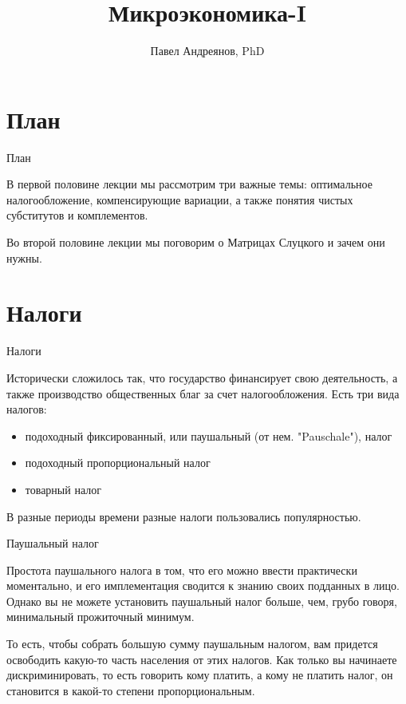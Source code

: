 \documentclass{beamer}
\title{
Микроэкономика-I
}
\author{
Павел Андреянов, PhD
}
\begin{document}
\maketitle

\section{План}

\begin{frame}{План}

В первой половине лекции мы рассмотрим три важные темы: оптимальное налогообложение, компенсирующие вариации, а также понятия чистых субститутов и комплементов.

Во второй половине лекции мы поговорим о Матрицах Слуцкого и зачем они нужны.

\end{frame}


\section{Налоги}

\begin{frame}{Налоги}

Исторически сложилось так, что государство финансирует свою деятельность, а также производство общественных благ за счет налогообложения. Есть три вида налогов:

\begin{itemize}
\item подоходный фиксированный, или паушальный (от нем. "Pauschale"), налог
\item подоходный пропорциональный налог
\item товарный налог

\end{itemize}

В разные периоды времени разные налоги пользовались популярностью. 

\end{frame}

\begin{frame}{Паушальный налог}

Простота паушального налога в том, что его можно ввести практически моментально, и его имплементация сводится к знанию своих подданных в лицо. Однако вы не можете установить паушальный налог больше, чем, грубо говоря, минимальный прожиточный минимум. 

То есть, чтобы собрать большую сумму паушальным налогом, вам придется освободить какую-то часть населения от этих налогов. Как только вы начинаете дискриминировать, то есть говорить кому платить, а кому не платить налог, он становится в какой-то степени пропорциональным.

\end{frame}
\end{document}
